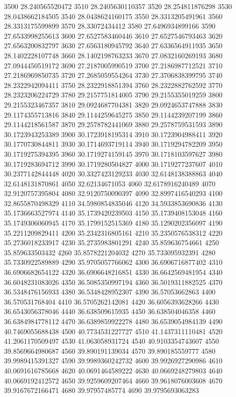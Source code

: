 {3500 28.240565520472
3510 28.2405630110357
3520 28.254811876298
3530 28.0438662184505
3540 28.0438624160175
3550 28.3313205491961
3560 28.3313175599899
3570 28.33072434412
3580 27.6496934899166
3590 27.6533998255613
3600 27.6527583460446
3610 27.6527546793463
3620 27.6563200832797
3630 27.6563180945792
3640 27.6336564911935
3650 28.1402228107748
3660 28.1402198763233
3670 27.0832160269193
3680 27.0944450519172
3690 27.2187005990519
3700 27.2186987712521
3710 27.2186969850735
3720 27.2685059554264
3730 27.3706838399795
3740 28.2322942094411
3750 28.2322918851394
3760 28.2322882762592
3770 28.2323206224729
3780 29.2157751814005
3790 29.2155355019259
3800 29.2155323467357
3810 29.0924687704381
3820 29.0924653747888
3830 29.1174355713816
3840 29.1144259645275
3850 29.1144239207199
3860 29.1144218561587
3870 29.2578782441069
3880 29.2578759531593
3890 30.1723943253389
3900 30.1723918195314
3910 30.1723904988411
3920 30.1770730844811
3930 30.1714693719114
3940 30.1719294782209
3950 30.1719275394395
3960 30.1719274159145
3970 30.1718103597627
3980 30.1719283694712
3990 30.1719280504827
4000 30.1719277237607
4010 30.2377142844448
4020 30.3327423129233
4030 32.6148138388863
4040 32.6148131870861
4050 32.62134671053
4060 32.6178916240489
4070 32.9120757395804
4080 32.9120750090397
4090 32.8997416540293
4100 32.8655870498329
4110 34.5980854835046
4120 34.5933853690836
4130 35.1736663527974
4140 35.1739420239503
4150 35.1739408153048
4160 35.1749306060945
4170 35.1799152515369
4180 35.1290202356097
4190 35.2211209829411
4200 35.2342316805161
4210 35.2350576538312
4220 35.2736018233917
4230 35.2735983801291
4240 35.859636754661
4250 35.859633503432
4260 35.8578221204032
4270 35.733095932391
4280 35.7330922589889
4290 35.9705057766062
4300 36.6906716877402
4310 36.6906682654122
4320 36.6906648216851
4330 36.6642569481954
4340 36.6048231083026
4350 36.5085350997194
4360 36.5019311882525
4370 36.5348476156933
4380 36.5348428952307
4390 36.57053662863
4400 36.570531768404
4410 36.5705262142081
4420 36.6056393628266
4430 36.6543056378046
4440 36.638509615935
4450 36.638504046358
4460 36.6384984778112
4470 36.6389859922278
4480 36.6539054984139
4490 40.7469055688438
4500 40.7734531227727
4510 41.1437311110481
4520 41.2061170509497
4530 41.063058931724
4540 40.9103354743607
4550 39.8569664980687
4560 39.890191139034
4570 39.890185559777
4580 39.9989415391327
4590 39.9989360242732
4600 39.9926927290986
4610 40.0691616785668
4620 40.0691464589222
4630 40.0669248279803
4640 40.0669192412572
4650 39.9259609207464
4660 39.9618076003608
4670 39.9167672166471
4680 39.97957485774
4690 39.9795693063283
}
